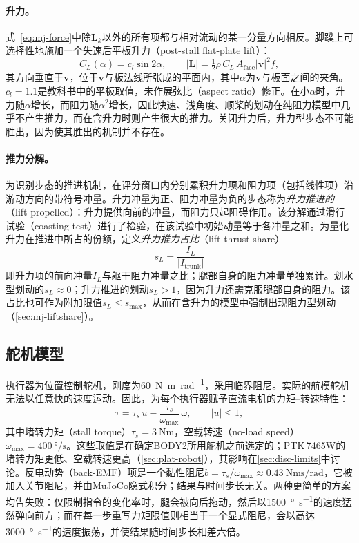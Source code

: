 \paragraph{升力。}式~\eqref{eq:mj-force}中除$\bm L_k$以外的所有项都与相对流动的某一分量方向相反。脚蹼上可选择性地施加一个失速后平板升力（post-stall flat-plate lift）：
\begin{equation}
  C_L(\alpha) = c_l \sin 2\alpha, \qquad |\bm L| = \tfrac12\rho\,C_L\,A_\text{face}|\bm v|^2 f,
  \label{eq:mj-lift}
\end{equation}
其方向垂直于$\bm v$，位于$\bm v$与板法线所张成的平面内，其中$\alpha$为$\bm v$与板面之间的夹角。$c_l=1.1$是教科书中的平板取值，未作展弦比（aspect ratio）修正。在小$\alpha$时，升力随$\alpha$增长，而阻力随$\alpha^2$增长，因此快速、浅角度、顺桨的划动在纯阻力模型中几乎不产生推力，而在含升力时则产生很大的推力。关闭升力后，升力型步态不可能胜出，因为使其胜出的机制并不存在。

\paragraph{推力分解。}为识别步态的推进机制，在评分窗口内分别累积升力项和阻力项（包括线性项）沿游动方向的带符号冲量。升力冲量为正、阻力冲量为负的步态称为\emph{升力推进的}（lift-propelled）：升力提供向前的冲量，而阻力只起阻碍作用。该分解通过滑行试验（coasting test）进行了检验，在该试验中初始动量等于各冲量之和。为量化升力在推进中所占的份额，定义\emph{升力推力占比}（lift thrust share）
\begin{equation}
  s_L = \frac{I_L}{|I_\text{trunk}|}
  \label{eq:liftshare}
\end{equation}
即升力项的前向冲量$I_L$与躯干阻力冲量之比；腿部自身的阻力冲量单独累计。划水型划动的$s_L\approx0$；升力推进的划动$s_L>1$，因为升力还需克服腿部自身的阻力。该占比也可作为附加限值$s_L\le s_\text{max}$，从而在含升力的模型中强制出现阻力型划动（\cref{sec:mj-liftshare}）。

\subsection{舵机模型}
\label{sec:mj-servo}

执行器为位置控制舵机，刚度为\SI{60}{\newton\metre\per\radian}，采用临界阻尼。实际的航模舵机无法以任意快的速度运动。因此，为每个执行器赋予直流电机的力矩--转速特性：
\begin{equation}
  \tau = \tau_s\,u - \frac{\tau_s}{\omega_\text{max}}\,\omega, \qquad |u|\le1,
  \label{eq:servo}
\end{equation}
其中堵转力矩（stall torque）$\tau_s=\SI{3}{\newton\metre}$，空载转速（no-load speed）$\omega_\text{max}=\SI{400}{\degree\per\second}$。这些取值是在确定BODY2所用舵机之前选定的；PTK\,7465W的堵转力矩更低、空载转速更高（\cref{sec:plat-robot}），其影响在\cref{sec:disc-limits}中讨论。反电动势（back-EMF）项是一个黏性阻尼$b=\tau_s/\omega_\text{max}\approx\SI{0.43}{\newton\metre\second\per\radian}$，它被加入关节阻尼，并由MuJoCo隐式积分；结果与时间步长无关。两种更简单的方案均告失败：仅限制指令的变化率时，腿会被向后拖动，然后以\SI{1500}{\degree\per\second}的速度猛然弹向前方；而在每一步重写力矩限值则相当于一个显式阻尼，会以高达\SI{3000}{\degree\per\second}的速度振荡，并使结果随时间步长相差六倍。

